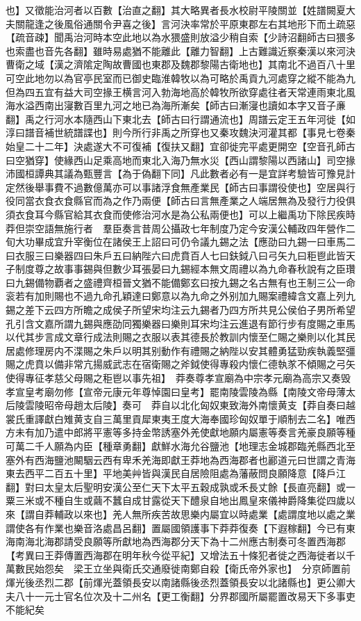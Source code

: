 也】又徵能治河者以百數【治直之翻】其大略異者長水校尉平陵關並【姓譜闕夏大夫關龍逢之後風俗通關令尹喜之後】言河決率常於平原東郡左右其地形下而土疏惡【疏音疎】聞禹治河時本空此地以為水猥盛則放溢少稍自索【少詩沼翻師古曰猥多也索盡也音先各翻】雖時易處猶不能離此【離力智翻】上古難識近察秦漢以來河決曹衛之域【漢之濟隂定陶故曹國也東郡及魏郡黎陽古衛地也】其南北不過百八十里可空此地勿以為官亭民室而已御史臨淮韓牧以為可略於禹貢九河處穿之縱不能為九但為四五宜有益大司空掾王横言河入勃海地高於韓牧所欲穿處往者天常連雨東北風海水溢西南出寖數百里九河之地已為海所漸矣【師古曰漸寖也讀如本字又音子亷翻】禹之行河水本隨西山下東北去【師古曰行謂通流也】周譜云定王五年河徙【如淳曰譜音補世統譜諜也】則今所行非禹之所穿也又秦攻魏決河灌其都【事見七卷秦始皇二十二年】決處遂大不可復補【復扶又翻】宜卻徙完平處更開空【空音孔師古曰空猶穿】使緣西山足乘高地而東北入海乃無水災【西山謂黎陽以西諸山】司空掾沛國桓譚典其議為甄豐言【為于偽翻下同】凡此數者必有一是宜詳考驗皆可豫見計定然後舉事費不過數億萬亦可以事諸浮食無產業民【師古曰事謂役使也】空居與行役同當衣食衣食縣官而為之作乃兩便【師古曰言無產業之人端居無為及發行力役俱須衣食耳今縣官給其衣食而使修治河水是為公私兩便也】可以上繼禹功下除民疾時莽但崇空語無施行者　羣臣奏言昔周公攝政七年制度乃定今安漢公輔政四年營作二旬大功畢成宜升宰衡位在諸侯王上詔曰可仍令議九錫之法【應劭曰九錫一曰車馬二曰衣服三曰樂器四曰朱戶五曰納陛六曰虎賁百人七曰鈇鉞八曰弓矢九曰秬鬯此皆天子制度尊之故事事錫與但數少耳張晏曰九錫經本無文周禮以為九命春秋說有之臣瓚曰九錫備物覇者之盛禮齊桓晉文猶不能備鄭玄曰按九錫之名古無有也王制三公一命衮若有加則賜也不過九命孔穎達曰鄭意以為九命之外别加九賜案禮緯含文嘉上列九錫之差下云四方所瞻之成侯子所望宋均注云九錫者乃四方所共見公侯伯子男所希望孔引含文嘉所謂九錫與應劭同獨樂器曰樂則耳宋均注云進退有節行步有度賜之車馬以代其步言成文章行成法則賜之衣服以表其德長於教訓内懷至仁賜之樂則以化其民居處修理房内不渫賜之朱戶以明其别動作有禮賜之納陛以安其體勇猛勁疾執義堅彊賜之虎賁以備非常亢揚威武志在宿衛賜之斧鉞使得專殺内懷仁德執㒸不傾賜之弓矢使得專征孝慈父母賜之秬鬯以事先祖】　莽奏尊孝宣廟為中宗孝元廟為高宗又奏毁孝宣皇考廟勿修【宣帝元康元年尊悼園曰皇考】罷南陵雲陵為縣【南陵文帝母薄太后陵雲陵昭帝母趙太后陵】奏可　莽自以北化匈奴東致海外南懷黄支【莽自奏曰越裳氏重譯獻白雉黄支自三萬里貢犀東夷王度大海奉國珍匈奴單于順制去二名】唯西方未有加乃遣中郎將平憲等多持金幣誘塞外羌使獻地願内屬憲等奏言羌豪良願等種可萬二千人願為内臣【種章勇翻】獻鮮水海允谷鹽池【地理志金城郡臨羌縣西北至塞外有西海鹽池闞駰云西有卑禾羌海即獻王莽地為西海郡者也酈道元曰世謂之青海東去西平二百五十里】平地美艸皆與漢民自居險阻處為藩蔽問良願降意【降戶江翻】對曰太皇太后聖明安漢公至仁天下太平五穀成孰或禾長丈餘【長直亮翻】或一粟三米或不種自生或繭不蠶自成甘露從天下醴泉自地出鳳皇來儀神爵降集從四歲以來【謂自莽輔政以來也】羌人無所疾苦故思樂内屬宜以時處業【處謂度地以處之業謂使各有作業也樂音洛處昌呂翻】置屬國領護事下莽莽復奏【下遐稼翻】今已有東海南海北海郡請受良願等所獻地為西海郡分天下為十二州應古制奏可冬置西海郡　【考異曰王莽傳置西海郡在明年秋今從平紀】又增法五十條犯者徙之西海徙者以千萬數民始怨矣　梁王立坐與衛氏交通廢徙南鄭自殺【衛氏帝外家也】　分京師置前煇光後丞烈二郡【前煇光蓋領長安以南諸縣後丞烈蓋領長安以北諸縣也】更公卿大夫八十一元士官名位次及十二州名【更工衡翻】分界郡國所屬罷置改易天下多事吏不能紀矣

